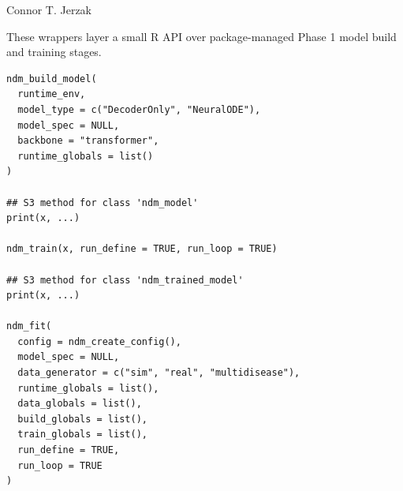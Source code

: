 \documentclass[a4paper]{book}
\begin{document}
%
\begin{Author}
Connor T. Jerzak 
\end{Author}
%
\begin{Description}
These wrappers layer a small R API over package-managed Phase 1 model build
and training stages.
\end{Description}
%
\begin{Usage}
\begin{verbatim}
ndm_build_model(
  runtime_env,
  model_type = c("DecoderOnly", "NeuralODE"),
  model_spec = NULL,
  backbone = "transformer",
  runtime_globals = list()
)

## S3 method for class 'ndm_model'
print(x, ...)

ndm_train(x, run_define = TRUE, run_loop = TRUE)

## S3 method for class 'ndm_trained_model'
print(x, ...)

ndm_fit(
  config = ndm_create_config(),
  model_spec = NULL,
  data_generator = c("sim", "real", "multidisease"),
  runtime_globals = list(),
  data_globals = list(),
  build_globals = list(),
  train_globals = list(),
  run_define = TRUE,
  run_loop = TRUE
)
\end{verbatim}
\end{Usage}
%
\end{document}
